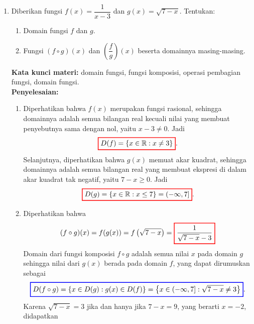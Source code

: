 \documentclass[10pt,openany,a4paper]{article}
\theoremstyle{definition}
\theoremstyle{definition}
\theoremstyle{plain}
\newenvironment{jawab}[2][tes]{%
\par\noindent\textbf{Kata kunci materi:} #1.\\
\textbf{Penyelesaian:} #2%
}{}
\begin{document}
\begin{enumerate}
    \item Diberikan fungsi $f(x)=\dfrac{1}{x-3}$ dan $g(x)=\sqrt{7-x}$. Tentukan:
    \begin{enumerate}
        \item Domain fungsi $f$ dan $g$.
        \item Fungsi $(f\circ g)(x)$ dan $\left(\dfrac{f}{g}\right)(x)$ beserta domainnya masing-masing.
    \end{enumerate}
    \begin{jawab}[domain fungsi, fungsi komposisi, operasi pembagian fungsi, domain fungsi]{
        \begin{enumerate}
            \item Diperhatikan bahwa $f(x)$ merupakan fungsi rasional, sehingga domainnya adalah semua bilangan real kecuali nilai yang membuat penyebutnya sama dengan nol, yaitu $x-3\neq 0$. Jadi
            \[
            \colorlet{oldcolor}{.}
        \color{red}
        \setlength{\fboxrule}{1pt} \boxed{\color{oldcolor}D(f)=\{x \in \mathbb{R} : x \neq 3\}}\color{oldcolor}.
            \]
            Selanjutnya, diperhatikan bahwa $g(x)$ memuat akar kuadrat, sehingga domainnya adalah semua bilangan real yang membuat ekspresi di dalam akar kuadrat tak negatif, yaitu $7-x\geq 0$. Jadi
            \[
            \colorlet{oldcolor}{.}
        \color{red}
        \setlength{\fboxrule}{1pt} \boxed{\color{oldcolor}D(g)=\{x \in \mathbb{R} : x \leq 7\}=(-\infty,7]}\color{oldcolor}.
            \]
            \item Diperhatikan bahwa
            \begin{align*}
                (f\circ g)(x) = f(g(x)) = f\left(\sqrt{7-x}\right) = \colorlet{oldcolor}{.}
        \color{red}
        \setlength{\fboxrule}{1pt} \boxed{\color{oldcolor}\frac{1}{\sqrt{7-x} - 3}}\color{oldcolor}
            \end{align*}
            Domain dari fungsi komposisi $f\circ g$ adalah semua nilai $x$ pada domain $g$ sehingga nilai dari $g(x)$ berada pada domain $f$, yang dapat dirumuskan sebagai
            \begin{align*}
                \colorlet{oldcolor}{.}
        \color{blue}
        \setlength{\fboxrule}{1pt} \boxed{\color{oldcolor}D(f\circ g) = \{x \in D(g) : g(x) \in D(f)\} = \left\{x \in (-\infty, 7] : \sqrt{7-x} \neq 3\right\}}\color{oldcolor}.
            \end{align*}
            Karena $\sqrt{7-x} = 3$ jika dan hanya jika $7-x = 9$, yang berarti $x = -2$, didapatkan
            \begin{align*}

\end{align*}
\end{enumerate}}
\end{jawab}
\end{enumerate}
\end{document}
